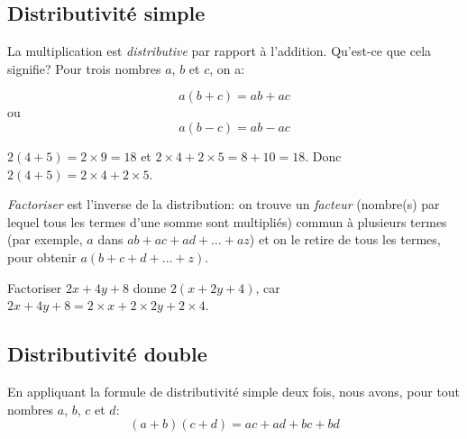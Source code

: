 \subsection{Distributivité simple}

La multiplication est \emph{distributive} par rapport à l'addition. Qu'est-ce que cela signifie? Pour trois nombres $a$, $b$ et $c$, on a:

\begin{equation}
    a(b+c) = ab + ac
\end{equation}
ou
\begin{equation}
    a(b-c) = ab - ac
\end{equation}

\begin{exemple}
    $2(4+5) = 2 \times 9 = 18$ et $2\times 4 + 2\times 5 = 8 + 10 = 18$. Donc $2(4+5) = 2\times 4 + 2\times 5$.
\end{exemple}

\begin{definition}
    \emph{Factoriser} est l'inverse de la distribution: on trouve un \emph{facteur} (nombre(s) par lequel tous les termes d'une somme sont multipliés) commun à plusieurs termes (par exemple, $a$ dans $ab + ac + ad + \dots + az$) et on le retire de tous les termes, pour obtenir $a(b+c+d+\dots+z)$.
\end{definition}

\begin{exemple}
    Factoriser $2x+4y+8$ donne $2(x+2y+4)$, car $2x+4y+8 = 2\times x + 2\times 2y + 2\times 4$.
\end{exemple}

\subsection{Distributivité double}

En appliquant la formule de distributivité simple deux fois, nous avons, pour tout nombres $a$, $b$, $c$ et $d$:
\[
    (a+b)(c+d) = ac + ad + bc + bd
\]